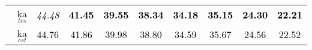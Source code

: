\begin{tabular}[t]{r|cccccccc}
ka$_{tcs}$ & \textcolor{black}{\em{44.48}} & \textcolor{black}{\textbf{41.45}} & \textcolor{black}{\textbf{39.55}} & \textcolor{black}{\textbf{38.34}} & \textcolor{black}{\textbf{34.18}} & \textcolor{black}{\textbf{35.15}} & \textcolor{black}{\textbf{24.30}} & \textcolor{black}{\textbf{22.21}}\\
ka$_{cst}$ & \textcolor{black}{44.76} & \textcolor{black}{41.86} & \textcolor{black}{39.98} & \textcolor{black}{38.80} & \textcolor{black}{34.59} & \textcolor{black}{35.67} & \textcolor{black}{24.56} & \textcolor{black}{22.52}\\
\bottomrule
\end{tabular}
